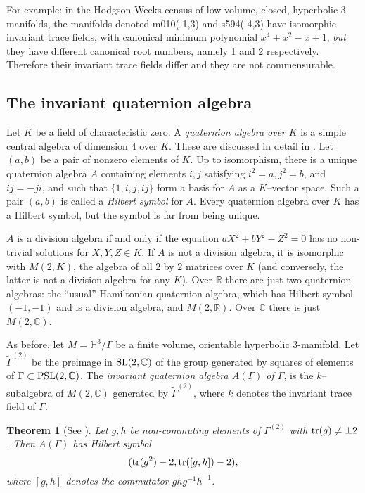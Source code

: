 \documentclass[a4paper]{amsart}
\def\H{{\mathbb H}}
\def\R{{\mathbb R}}
\def\C{{\mathbb C}}
\def\psl2c{\mbox{\rm PSL}(2,\C)}
\def\sl2c{\mbox{\rm SL}(2,\C)}
\def\tr{\mbox{\rm tr}}
\newtheorem{theorem}{Theorem}[section]
\theoremstyle{definition}
\begin{document}
For example: in the Hodgson-Weeks census of low-volume, closed,
hyperbolic 3-manifolds, the manifolds denoted {\hbox{m010}(-1,3)} and
{\hbox{s594}(-4,3)} have isomorphic invariant trace fields, with
canonical minimum polynomial $x^4 + x^2 - x + 1$, {\em but} they have
different canonical root numbers, namely 1 and 2
respectively. Therefore their invariant trace fields differ and they
are not commensurable.

\subsection{The invariant quaternion algebra}

\def\eqn{aX^2 + bY^2 - Z^2 = 0}

Let $K$ be a field of characteristic zero. A {\em quaternion algebra over}
$K$ is a simple central algebra of dimension 4 over $K$. These are discussed
in detail in \cite{vigneras}.
Let $(a,b)$
be a pair of nonzero elements of $K$. Up to isomorphism, there is a
unique quaternion algebra $A$ containing elements $i,j$ satisfying $i^2 =
a, j^2 = b$, and $ij = -ji$, and such that $\{1,i,j,ij\}$ form a basis
for $A$ as a $K$--vector space. Such a pair $(a,b)$ is called a {\em Hilbert
symbol} for $A$. Every quaternion algebra over $K$ has a Hilbert
symbol, but the symbol is far from being unique. 

$A$ is a division algebra if and only if the equation $\eqn$ has no
non-trivial solutions for $X,Y,Z\in K$. If $A$ is not a division
algebra, it is isomorphic with $M(2,K)$, the algebra of all $2$ by $2$ matrices
over $K$ (and conversely, the latter is not a division algebra for any
$K$). Over $\R$ there are just two quaternion algebras: the ``usual''
Hamiltonian quaternion algebra, which has Hilbert symbol $(-1,-1)$ and
is a division algebra, and $M(2,\R)$. Over $\C$ there is just
$M(2,\C)$.


As before, let $M = \H^3/\Gamma$ be a finite volume, orientable
hyperbolic 3-manifold. Let $\tilde{\Gamma}^{(2)}$ be the preimage in
$\sl2c$ of the group generated by squares of elements of 
$\Gamma \subset \psl2c$. The
{\em invariant quaternion algebra $A(\Gamma)$ of $\Gamma$}, is the
$k$--subalgebra of $M(2,\C)$ generated by $\tilde{\Gamma}^{(2)}$,
where $k$ denotes the invariant trace field of $\Gamma$. 

\begin{theorem}[See \cite{hlm}]
Let $g,h$ be non-commuting elements of $\Gamma^{(2)}$ with
$\tr(g)\neq \pm 2$. 
Then $A(\Gamma)$ has Hilbert symbol
$$
(\tr(g^2) - 2, \tr([g,h]) - 2),
$$
where $[g,h]$ denotes the commutator $ghg^{-1}h^{-1}$. 
\end{theorem}
\end{document}
